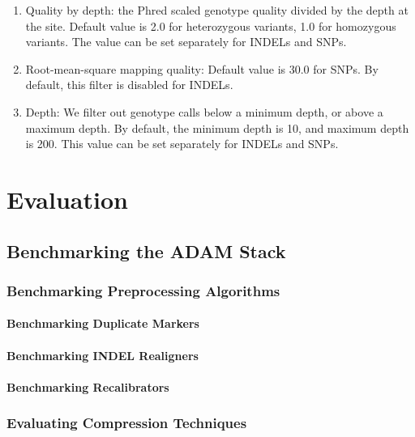 \documentclass[phd]{ucbthesis}
\begin{document}
\begin{enumerate}
\item Quality by depth: the Phred scaled genotype quality divided by the depth at
the site. Default value is 2.0 for heterozygous variants, 1.0 for homozygous
variants. The value can be set separately for INDELs and SNPs.
\item Root-mean-square mapping quality: Default value is 30.0 for SNPs. By default,
this filter is disabled for INDELs.
\item Depth: We filter out genotype calls below a minimum depth, or above a maximum
depth. By default, the minimum depth is 10, and maximum depth is 200. This value
can be set separately for INDELs and SNPs.
\end{enumerate}

\part{Evaluation}

\chapter{Benchmarking the {ADAM} Stack}
\label{chap:benchmarking}

\section{Benchmarking Preprocessing Algorithms}
\label{sec:benchmarking-preprocessing}

\subsection{Benchmarking Duplicate Markers}
\label{sec:benchmarking-duplicate-markers}

\subsection{Benchmarking INDEL Realigners}
\label{sec:benchmarking-indel-realigners}

\subsection{Benchmarking Recalibrators}
\label{sec:benchmarking-recalibrators}

\section{Evaluating Compression Techniques}
\label{sec:compression}
\end{document}
